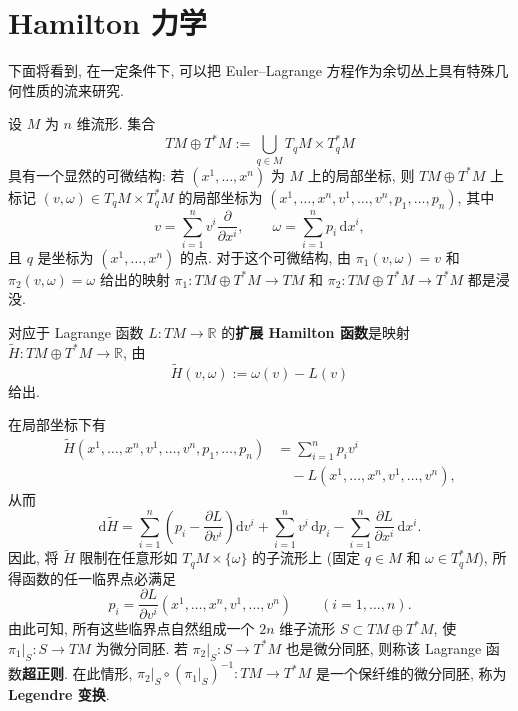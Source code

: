 \section{Hamilton 力学}\label{sec:hamiltonian-mechanics}

下面将看到, 在一定条件下, 可以把 Euler–Lagrange 方程作为余切丛上具有特殊几何性质的流来研究.

设 $M$ 为 $n$ 维流形. 集合
\[
  TM\oplus T^*M:=\bigcup_{q\in M}T_qM\times T_q^*M
\]
具有一个显然的可微结构: 若 $(x^1,\ldots,x^n)$ 为 $M$ 上的局部坐标, 则 $TM\oplus T^*M$ 上标记 $(v,\omega)\in T_qM\times T_q^*M$ 的局部坐标为 $(x^1,\ldots,x^n,v^1,\ldots,v^n,p_1,\ldots,p_n)$, 其中
\[
  v=\sum_{i=1}^n v^i\frac{\partial}{\partial x^i},
  \qquad \omega=\sum_{i=1}^n p_i\,\mathrm{d}x^i,
\]
且 $q$ 是坐标为 $(x^1,\ldots,x^n)$ 的点. 对于这个可微结构, 由 $\pi_1(v,\omega)=v$ 和 $\pi_2(v,\omega)=\omega$ 给出的映射 $\pi_1:TM\oplus T^*M\to TM$ 和 $\pi_2:TM\oplus T^*M\to T^*M$ 都是浸没.

\begin{RiemannDefinition}\label{def:extended-hamiltonian-function}
对应于 Lagrange 函数 $L:TM\to\mathbb{R}$ 的\textbf{扩展 Hamilton 函数}是映射 $\widetilde H:TM\oplus T^*M\to\mathbb{R}$, 由
\[
  \widetilde H(v,\omega):=\omega(v)-L(v)
\]
给出.
\end{RiemannDefinition}

在局部坐标下有
\begin{align*}
  \widetilde H(x^1,\ldots,x^n,v^1,\ldots,v^n,p_1,\ldots,p_n)
  &=\sum_{i=1}^n p_iv^i\\
  &\quad-L(x^1,\ldots,x^n,v^1,\ldots,v^n),
\end{align*}
从而
\[
  \mathrm{d}\widetilde H
  =\sum_{i=1}^n\left(p_i-\frac{\partial L}{\partial v^i}\right)\mathrm{d}v^i
   +\sum_{i=1}^n v^i\,\mathrm{d}p_i
   -\sum_{i=1}^n\frac{\partial L}{\partial x^i}\,\mathrm{d}x^i.
\]
因此, 将 $\widetilde H$ 限制在任意形如 $T_qM\times\{\omega\}$ 的子流形上 (固定 $q\in M$ 和 $\omega\in T_q^*M$), 所得函数的任一临界点必满足
\[
  p_i=\frac{\partial L}{\partial v^i}(x^1,\ldots,x^n,v^1,\ldots,v^n)
  \qquad(i=1,\ldots,n).
\]
由此可知, 所有这些临界点自然组成一个 $2n$ 维子流形 $S\subset TM\oplus T^*M$, 使 $\pi_1|_S:S\to TM$ 为微分同胚. 若 $\pi_2|_S:S\to T^*M$ 也是微分同胚, 则称该 Lagrange 函数\textbf{超正则}. 在此情形, $\pi_2|_S\circ(\pi_1|_S)^{-1}:TM\to T^*M$ 是一个保纤维的微分同胚, 称为 \textbf{Legendre 变换}.

